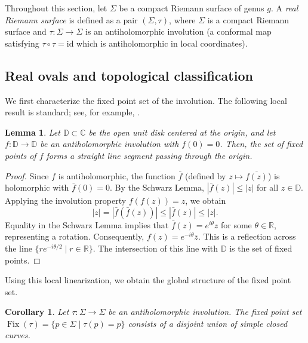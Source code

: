 \documentclass[11pt,a4paper]{article}
\newtheorem{lemma}[theorem]{Lemma}
\newtheorem{corollary}[theorem]{Corollary}
\theoremstyle{definition}
\DeclareMathOperator{\fix}{\mathrm{Fix}}
\begin{document}
Throughout this section, let $\Sigma$ be a compact Riemann surface of genus $g$. A \emph{real Riemann surface} is defined as a pair $(\Sigma, \tau)$, where $\Sigma$ is a compact Riemann surface and $\tau: \Sigma \to \Sigma$ is an antiholomorphic involution (a conformal map satisfying $\tau \circ \tau = \mathrm{id}$ which is antiholomorphic in local coordinates).

\subsection{Real ovals and topological classification}\label{sec:realovals}

We first characterize the fixed point set of the involution. The following local result is standard; see, for example, \cite{J04}.

\begin{lemma}\label{lem:fixedpoint}
	Let $\mathds{D} \subset \mathds{C}$ be the open unit disk centered at the origin, and let $f : \mathds{D} \rightarrow \mathds{D}$ be an antiholomorphic involution with $f(0) = 0$. Then, the set of fixed points of $f$ forms a straight line segment passing through the origin.
\end{lemma}

\begin{proof}
	Since $f$ is antiholomorphic, the function $\bar{f}$ (defined by $z \mapsto \overline{f(z)}$) is holomorphic with $\bar{f}(0) = 0$. By the Schwarz Lemma, $|\bar{f}(z)| \leq |z|$ for all $z \in \mathds{D}$. Applying the involution property $f(f(z)) = z$, we obtain
	\[
	|z| = |\bar{f}(\bar{f}(z))| \leq |\bar{f}(z)| \leq |z|.
	\]
	Equality in the Schwarz Lemma implies that $\bar{f}(z) = e^{i\theta} z$ for some $\theta \in \mathds{R}$, representing a rotation. Consequently, $f(z) = e^{-i\theta} \bar{z}$. This is a reflection across the line $\{ r e^{-i\theta/2} \mid r \in \mathds{R} \}$. The intersection of this line with $\mathds{D}$ is the set of fixed points.
\end{proof}

Using this local linearization, we obtain the global structure of the fixed point set.

\begin{corollary}\label{cor:fixedpoint}
	Let $\tau: \Sigma \to \Sigma$ be an antiholomorphic involution. The fixed point set $\fix(\tau) = \{p \in \Sigma \mid \tau(p)=p\}$ consists of a disjoint union of simple closed curves.
\end{corollary}
\end{document}
